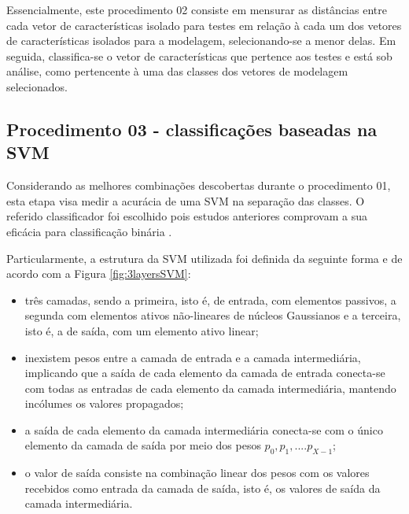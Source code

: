 		\par Essencialmente, este procedimento 02 consiste em mensurar as distâncias entre cada vetor de características isolado para testes em relação à cada um dos vetores de características isolados para a modelagem, selecionando-se a menor delas. Em seguida, classifica-se o vetor de características que pertence aos testes e está sob análise, como pertencente à uma das classes dos vetores de modelagem selecionados.   
								
		

		\subsection{Procedimento 03 - classificações baseadas na SVM}
		\label{chap:propApproach:sec:Experimento03}
		\par Considerando as melhores combinações descobertas durante o procedimento 01, esta etapa visa medir a acurácia de uma SVM na separação das classes. O referido classificador foi escolhido pois estudos anteriores comprovam a sua eficácia para classificação binária \cite{bennett2000support}. 
		
		\par Particularmente, a estrutura da SVM utilizada foi definida da seguinte forma e de acordo com a Figura \ref{fig:3layersSVM}: 
		\begin{itemize}
		\item{}três camadas, sendo a primeira, isto é, de entrada, com elementos passivos, a segunda com elementos ativos não-lineares de núcleos Gaussianos e a terceira, isto é, a de saída, com um elemento ativo linear; 
		\item{}inexistem pesos entre a camada de entrada e a camada intermediária, implicando que a saída de cada elemento da camada de entrada conecta-se com todas as entradas de cada elemento da camada intermediária, mantendo incólumes os valores propagados;
		\item{}a saída de cada elemento da camada intermediária conecta-se com o único elemento da camada de saída por meio dos pesos $p_0, p_1, .... p_{X-1}$;
		\item{}o valor de saída consiste na combinação linear dos pesos com os valores recebidos como entrada da camada de saída, isto é, os valores de saída da camada intermediária.
		\end{itemize}
		
		

